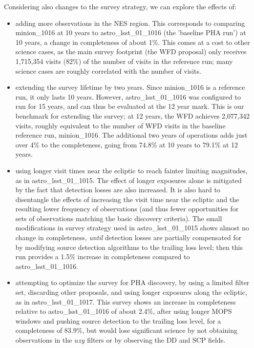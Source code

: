 Considering also changes to the survey strategy, we can explore the effects of:
\begin{itemize}
\item adding more observations in the NES region. This corresponds to comparing minion\_1016 at 10 years to astro\_lsst\_01\_1016 (the 'baseline PHA run') at 10 years, a change in completeness of about 1\%. This comes at a cost to other science cases, as the main survey footprint (the WFD proposal) only receives 1,715,354 visits (82\%) of the number of visits in the reference run; many science cases are roughly correlated with the number of visits. 
\item extending the survey lifetime by two years. Since minion\_1016 is a reference run, it only lasts 10 years. However, astro\_lsst\_01\_1016 was configured to run for 15 years, and can thus be evaluated at the 12 year mark. This is our benchmark for extending the survey; at 12 years, the WFD achieves 2,077,342 visits, roughly equivalent to the number of WFD visits in the baseline reference run, minion\_1016.  The additional two years of operations adds just over 4\% to the completeness, going from 74.8\% at 10 years to 79.1\% at 12 years. 
\item using longer visit times near the ecliptic to reach fainter limiting magnitudes, as in astro\_lsst\_01\_1015. The effect of longer exposures alone is mitigated by the fact that detection losses are also increased. It is also hard to disentangle the effects of increasing the visit time near the ecliptic and the resulting lower frequency of observations (and thus fewer opportunities for sets of observations matching the basic discovery criteria). The small modifications in survey strategy used in astro\_lsst\_01\_1015 shows almost no change in completeness, {\it until} detection losses are partially compensated for by modifying source detection algorithms to the trailing loss level; then this run provides a 1.5\% increase in completeness compared to astro\_lsst\_01\_1016. 
\item attempting to optimize the survey for PHA discovery, by using a limited filter set, discarding other proposals, and using longer exposures along the ecliptic, as in astro\_lsst\_01\_1017. This survey shows an increase in completeness relative to astro\_lsst\_01\_1016 of about 2.4\%, after using longer MOPS windows and pushing source detection to the trailing loss level, for a  completeness of 83.9\%, but would lose significant science by not obtaining observations in the $uzy$ filters or by observing the DD and SCP fields.
\end{itemize}

